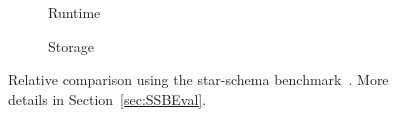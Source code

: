 \begin{figure}[t]
	{
		\footnotesize
		\graphicspath{{results/ssb/}}
		\null
		\begin{subfigure}[t]{1in}
			
			\caption{Runtime}
			\label{fig:teaser:runtime}
		\end{subfigure}
		\hfill
		\begin{subfigure}[t]{1in}
			
			\caption{Storage}
			\label{fig:teaser:memory}
		\end{subfigure}
		\hfill
		\begin{subfigure}[t]{0.8in}
			
		\end{subfigure}
		\null
	}
	\vspace{-0.2cm}
	\caption{Relative comparison using the star-schema benchmark~\cite{DBLP:journals/corr/Sanchez16a}. More details in Section~\ref{sec:SSBEval}.}
	\label{fig:teaser}
	\vspace{-0.5cm}
\end{figure}

